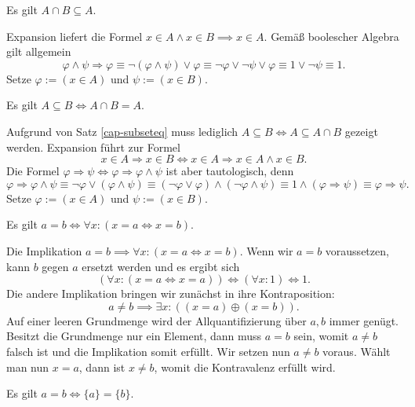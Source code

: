 \begin{Satz}\label{cap-subseteq}
Es gilt $A\cap B\subseteq A$.
\end{Satz}
\begin{Beweis}
Expansion liefert die Formel $x\in A\land x\in B\implies x\in A$.
Gemäß boolescher Algebra gilt allgemein
\[\varphi\land\psi\Rightarrow\varphi
\equiv \neg(\varphi\land\psi)\lor\varphi
\equiv \neg\varphi\lor\neg\psi\lor\varphi
\equiv 1\lor\neg\psi\equiv 1.\]
Setze $\varphi:=(x\in A)$ und $\psi:=(x\in B)$.\;\qedsymbol
\end{Beweis}

\begin{Satz}\label{subseteq-char}
Es gilt $A\subseteq B\iff A\cap B=A$.
\end{Satz}
\begin{Beweis}
Aufgrund von Satz \ref{cap-subseteq} muss lediglich
$A\subseteq B\iff A\subseteq A\cap B$ gezeigt werden.
Expansion führt zur Formel
\[x\in A\Rightarrow x\in B\iff x\in A\Rightarrow x\in A\land x\in B.\]
Die Formel $\varphi\Rightarrow\psi\iff\varphi\Rightarrow\varphi\land\psi$
ist aber tautologisch, denn
\[\varphi\Rightarrow\varphi\land\psi\equiv\neg\varphi\lor(\varphi\land\psi)
\equiv (\neg\varphi\lor\varphi)\land(\neg\varphi\land\psi)
\equiv 1\land(\varphi\Rightarrow\psi)\equiv \varphi\Rightarrow\psi.\]
Setze $\varphi:=(x\in A)$ und $\psi:=(x\in B)$.\;\qedsymbol
\end{Beweis}

\begin{Satz}\label{eq-iff-all-iff}
Es gilt $a=b\iff \forall x\colon (x=a\iff x=b)$.
\end{Satz}

\begin{Beweis}
Die Implikation $a=b\implies\forall x\colon (x=a\iff x=b)$.
Wenn wir $a=b$ voraussetzen, kann $b$ gegen $a$ ersetzt werden
und es ergibt sich
\[(\forall x\colon (x=a\iff x=a))\iff (\forall x\colon 1)\iff 1.\]
Die andere Implikation bringen wir zunächst in ihre Kontraposition:
\[a\ne b\implies \exists x\colon ((x=a)\oplus (x=b)).\]
Auf einer leeren Grundmenge wird der Allquantifizierung
über $a,b$ immer genügt. Besitzt die Grundmenge nur ein Element,
dann muss $a=b$ sein, womit $a\ne b$ falsch ist und die Implikation
somit erfüllt. Wir setzen nun $a\ne b$ voraus. Wählt man nun
$x=a$, dann ist $x\ne b$, womit die Kontravalenz erfüllt wird.\;\qedsymbol
\end{Beweis}

\begin{Satz}
Es gilt $a=b\iff\{a\}=\{b\}$.
\end{Satz}

